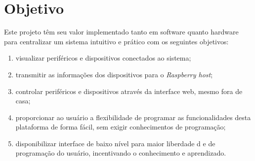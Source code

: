 \documentclass[../../layout.tex]{subfiles}
\begin{document}
\section{Objetivo}
\hspace*{3em}Este projeto têm seu valor implementado tanto em software quanto hardware para centralizar um sistema intuitivo e prático com os seguintes objetivos:
\begin{enumerate}[label=\alph*)]
\itemsep0em
\item visualizar periféricos e dispositivos conectados ao sistema;
\item transmitir as informações dos dispositivos para o \emph{Raspberry host};
\item controlar periféricos e dispositivos através da interface web, mesmo fora de casa;
\item proporcionar ao usuário a flexibilidade de programar as funcionalidades desta plataforma de forma fácil, sem exigir conhecimentos de programação;
\item disponibilizar interface de baixo nível para maior liberdade d e de programação do usuário, incentivando o conhecimento e aprendizado.
\end{enumerate}
\end{document}
